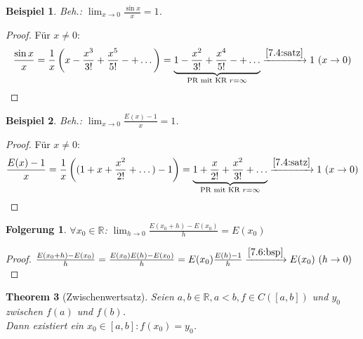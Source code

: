 \documentclass[14pt,titlepage,ngerman,a4paper,headsepline,DIV15,halfparskip*]{scrartcl}
\newcommand{\R}{\mathbb{R}}
\theoremstyle{named}
\newtheorem{namedtheorem}{Theorem} \counterwithin{namedtheorem}{section}
\theoremstyle{dotless}
\newtheorem{beispiel}[namedtheorem]{Beispiel}
\newtheorem*{folgerung}{Folgerung}
\begin{document}
\begin{beispiel} \label{7.5:bsp}
	Beh.: $\lim_{x \rightarrow 0} \frac{\sin x}{x} = 1$.
\end{beispiel}

\begin{proof}
	Für $x \neq 0$: 
	$$ \frac{\sin x}{x} = \frac{1}{x} \left( x - \frac{x^{3}}{3!} + \frac{x^{5}}{5!} -+ \dotsc \right) = \underbrace{1 - \frac{x^{2}}{3!} + \frac{x^{4}}{5!} -+ \dotsc}_{\text{PR mit KR } r = \infty} \xrightarrow[]{\ref{7.4:satz}} 1 ~(x \rightarrow 0) $$
\end{proof}


\begin{beispiel} \label{7.6:bsp}
	Beh.: $\lim_{x \rightarrow 0} \frac{E(x) - 1}{x} = 1$.
\end{beispiel}

\begin{proof}
	Für $x \neq 0$:
	$$ \frac{E(x) - 1}{x} = \frac{1}{x} \left( ( 1+ x + \frac{x^{2}}{2!} + \dotsc) - 1 \right) = \underbrace{1 + \frac{x}{2!} + \frac{x^{2}}{3!} + \dotsc}_{\text{PR mit KR } r = \infty} \xrightarrow[]{\ref{7.4:satz}} 1 ~(x \rightarrow 0) $$
\end{proof}


\begin{folgerung}
	$\forall x_{0} \in \R$: $\lim_{h \rightarrow 0} \frac{E(x_{0} + h) - E(x_{0})}{h} = E(x_{0})$
\end{folgerung}

\begin{proof}
	$\frac{E(x_{0} + h) - E(x_{0})}{h} =  \frac{E(x_{0}) E(h) - E(x_{0})}{h} =  E(x_{0}) \frac{E(h) - 1}{h} \xrightarrow[]{\ref{7.6:bsp}} E(x_{0}) ~(h \rightarrow 0)$
\end{proof}

\begin{namedtheorem}[Zwischenwertsatz] \label{7.7:prop-Zwischenwertsatz}
	Seien $a, b \in \R, a < b, f \in C\left([a,b]\right)$ und $y_{0}$ zwischen $f(a)$ und $f(b)$. \\
	Dann existiert ein $x_{0} \in [a, b]: f(x_{0}) = y_{0}$.
\end{namedtheorem}
\end{document}
